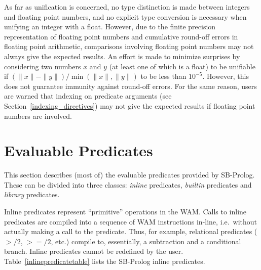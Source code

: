As far as unification is concerned, no type distinction is made between integers
and floating point numbers, and no explicit type conversion is necessary
when unifying an integer with a float.
However, due to the finite precision
representation of floating point numbers and cumulative round-off errors in
floating point arithmetic, comparisons involving floating point numbers may
not always give the expected results.
An effort is made to minimize surprises by considering two numbers $x$ and $y$
(at least one of which is a float) to be unifiable
if $(\|x\| -\|y\|)/\min(\|x\|,\|y\|)$ to be less than $10^{-5}$.
However, this does not guarantee immunity against round-off errors.
For the same reason, users are warned that
indexing on predicate arguments
(see Section~\ref{indexing_directives}) may not give the
expected results if floating point numbers are involved.

\section{Evaluable Predicates}

This section describes (most of) the evaluable predicates provided by SB-Prolog.
These can be divided into three classes:
{\em inline} predicates,
{\em builtin} predicates
and {\em library} predicates.

Inline predicates represent ``primitive'' operations in the WAM.
Calls to inline predicates are compiled into a sequence of WAM
instructions in-line, i.e.\ without actually making a call to the predicate.
Thus, for example, relational predicates ($>/2$, $>=/2$, etc.) compile to,
essentially, a subtraction and a conditional branch.
Inline predicates cannot be redefined by the user.
Table~\ref{inlinepredicatetable} lists the SB-Prolog inline predicates.
\begin{table}[htbp]
\caption{Inline Predicates of SB-Prolog}\label{inlinepredicatetable}
\end{table}

